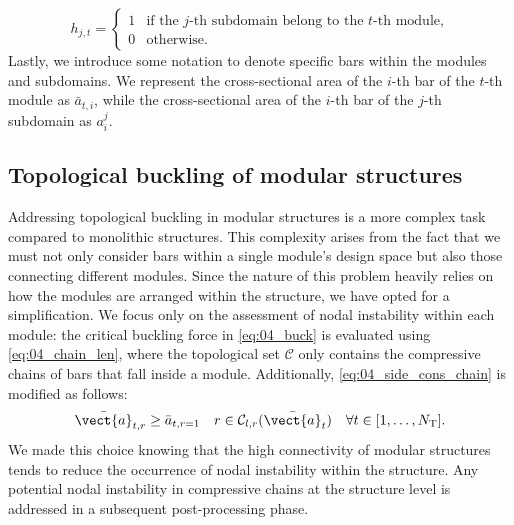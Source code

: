 \begin{equation}
    h_{j,t} =
    \begin{cases}
      1 & \text{if the $j$-th subdomain belong to the $t$-th module,} \\
      0 & \text{otherwise.} 
    \end{cases}
\end{equation}
Lastly, we introduce some notation to denote specific bars within the modules and subdomains. We represent the cross-sectional area of the $i$-th bar of the $t$-th module as $\bar{a}_{t,i}$, while the cross-sectional area of the $i$-th bar of the $j$-th subdomain as $a^j_i$.
\subsection{Topological buckling of modular structures} \label{sec:05_topological}
Addressing topological buckling in modular structures is a more complex task compared to monolithic structures. This complexity arises from the fact that we must not only consider bars within a single module's design space but also those connecting different modules. Since the nature of this problem heavily relies on how the modules are arranged within the structure, we have opted for a simplification.  We focus only on the assessment of nodal instability within each module: the critical buckling force in \eqref{eq:04_buck} is evaluated using \eqref{eq:04_chain_len}, where the topological set $\mathcal{C}$ only contains the compressive chains of bars that fall inside a module. Additionally, \eqref{eq:04_side_cons_chain} is modified as follows:
\begin{equation}\label{eq:05_side_cons_chain_modular}
    \bar{\vect{a}}_{t,r} \geq \bar{a}_{t,r=1} \quad r \in \mathcal{C}_{l,r}(\bar{\vect{a}}_t) \quad \forall t \in [1,\dots,N_\text{T}].
\end{equation}
We made this choice knowing that the high connectivity of modular structures tends to reduce the occurrence of nodal instability within the structure. Any potential nodal instability in compressive chains at the structure level is addressed in a subsequent post-processing phase.

